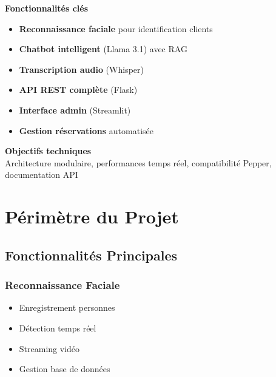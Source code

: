\documentclass[12pt,a4paper]{article}
\newenvironment{block}[1]{\begin{center}\begin{minipage}{0.9\textwidth}\textbf{#1}\\}{\end{minipage}\end{center}}
\newenvironment{alertblock}[1]{\begin{center}\begin{minipage}{0.9\textwidth}\color{accentorange}\textbf{#1}\\}{\end{minipage}\end{center}}
\begin{document}
\begin{block}{Fonctionnalités clés}
\begin{itemize}
    \item[\textcolor{primaryblue}{\faUser}] \textbf{Reconnaissance faciale} pour identification clients
    \item[\textcolor{primaryblue}{\faComments}] \textbf{Chatbot intelligent} (Llama 3.1) avec RAG
    \item[\textcolor{primaryblue}{\faMicrophone}] \textbf{Transcription audio} (Whisper)
    \item[\textcolor{primaryblue}{\faDatabase}] \textbf{API REST complète} (Flask)
    \item[\textcolor{primaryblue}{\faDesktop}] \textbf{Interface admin} (Streamlit)
    \item[\textcolor{primaryblue}{\faBed}] \textbf{Gestion réservations} automatisée
\end{itemize}
\end{block}

\begin{alertblock}{Objectifs techniques}
Architecture modulaire, performances temps réel, compatibilité Pepper, documentation API
\end{alertblock}


\section{Périmètre du Projet}

\subsection{Fonctionnalités Principales}

\subsubsection{Reconnaissance Faciale}
\begin{itemize}
    \item Enregistrement personnes
    \item Détection temps réel
    \item Streaming vidéo
    \item Gestion base de données
\end{itemize}
\end{document}
